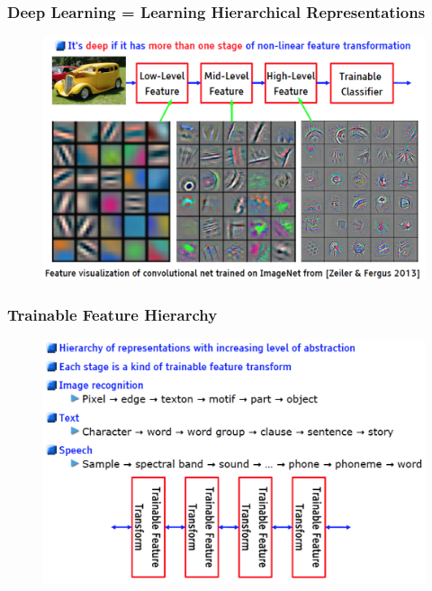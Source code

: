 \documentclass{beamer}
\begin{document}
\begin{frame}
\frametitle{Deep Learning = Learning Hierarchical Representations}
\begin{figure}
      \includegraphics[width=1\textwidth]{figs/intro3.png}
\end{figure}
\end{frame}

\begin{frame}
\frametitle{Trainable Feature Hierarchy}
\begin{figure}
      \includegraphics[width=1\textwidth]{figs/intro4.png}
\end{figure}
\end{frame}
\end{document}
